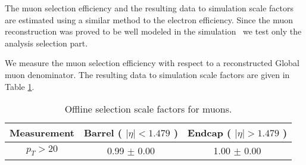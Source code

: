 
The muon selection efficiency and the resulting data to simulation
scale factors are estimated using a similar method to the electron efficiency.
Since the muon reconstruction was proved to be well modeled in the simulation~\cite{VBTFCrossSectionNote}
we test only the analysis selection part.

We measure the muon selection efficiency with respect to a reconstructed Global muon
denominator.
The resulting data to simulation scale factors are given in Table \ref{tab:eff_mu_offline}.

\begin{table}[!ht]
\begin{center}
\begin{tabular}{c|c|c}
\hline
Measurement & Barrel ( $|\eta|<1.479$ )   & Endcap ( $|\eta|>1.479$ )  \\ 
\hline
$  p_T>  20$ & 0.99 $\pm$ 0.00  & 1.00 $\pm$ 0.00  \\ \hline 
\end{tabular}
\caption{Offline selection scale factors for muons.}
\label{tab:eff_mu_offline}
\end{center}
\end{table}

